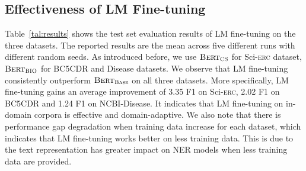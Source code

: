 \documentclass[10pt, conference, compsocconf]{IEEEtran}
\newcommand{\bert}{\textsc{Bert}\xspace}
\newcommand{\scibert}{\textsc{SciBert}\xspace}
\newcommand{\biobert}{\textsc{BioBert}\xspace}
\newcommand{\Scierc}{\textsc{S}ci-\textsc{erc}\xspace}
\newcommand{\bio}{$\mathcal{BIO}$\xspace}
\newcommand{\cs}{$\mathcal{CS}$\xspace}
\newcommand{\bertcs}{$\bert_{\textsc{CS}}$\xspace}
\newcommand{\bertbio}{$\bert_{\textsc{BIO}}$\xspace}
\newcommand{\bertbase}{$\bert_{\textsc{Base}}$\xspace}
\begin{document}
\subsection{Effectiveness of LM Fine-tuning}

Table~\ref{tal:results} shows the test set evaluation 
results of LM fine-tuning on the three datasets. 
The reported results are the mean across five different runs with different random seeds.
As introduced before, we use \bertcs for \Scierc dataset, \bertbio for BC5CDR and Disease datasets.
We observe that LM fine-tuning consistently outperform \bertbase on all three datasets.
More specifically, LM fine-tuning gains an average improvement of 3.35 F1 
on \Scierc, 2.02 F1 on BC5CDR and 1.24 F1 on NCBI-Disease. It indicates that 
LM fine-tuning on in-domain corpora is effective and domain-adaptive.
We also note that there is performance gap degradation when training data increase for each dataset,
which indicates that LM fine-tuning works better on less training data.
This is due to the text representation has greater impact on NER models
when less training data are provided. 


\end{document}
